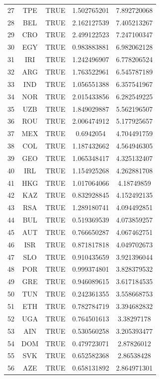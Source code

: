 \documentclass[12pt]{article}
\begin{document}
\begin{longtable}{|c|c|c|c|c|}
27 & TPE & TRUE & 1.502765201 & 7.892720068 \\
28 & BEL & TRUE & 2.162127539 & 7.405213267 \\
29 & CRO & TRUE & 2.499122523 & 7.247100347 \\
30 & EGY & TRUE & 0.983883881 & 6.982062128 \\
31 & IRI & TRUE & 1.242496907 & 6.778206524 \\
32 & ARG & TRUE & 1.763522961 & 6.545787189 \\
33 & IND & TRUE & 1.056551388 & 6.357541967 \\
34 & NOR & TRUE & 2.015433856 & 6.282549225 \\
35 & UZB & TRUE & 1.849029887 & 5.562196507 \\
36 & ROU & TRUE & 2.006474912 & 5.177925657 \\
37 & MEX & TRUE & 0.6942054 & 4.704491759 \\
38 & COL & TRUE & 1.187432662 & 4.564946305 \\
39 & GEO & TRUE & 1.065348417 & 4.325132407 \\
40 & IRL & TRUE & 1.154925268 & 4.262881708 \\
41 & HKG & TRUE & 1.017064066 & 4.18749859 \\
42 & KAZ & TRUE & 0.832928845 & 4.152492135 \\
43 & RSA & TRUE & 1.289180741 & 4.094492851 \\
44 & BUL & TRUE & 0.519369539 & 4.073859257 \\
45 & AUT & TRUE & 0.766650287 & 4.067462751 \\
46 & ISR & TRUE & 0.871817818 & 4.049702673 \\
47 & SLO & TRUE & 0.910435659 & 3.921396044 \\
48 & POR & TRUE & 0.999374801 & 3.828379532 \\
49 & GRE & TRUE & 0.946089615 & 3.617184535 \\
50 & TUN & TRUE & 0.242361355 & 3.558668753 \\
51 & ETH & TRUE & 0.782784719 & 3.394682832 \\
52 & UGA & TRUE & 0.764501613 & 3.38297178 \\
53 & AIN & TRUE & 0.530560258 & 3.205393477 \\
54 & DOM & TRUE & 0.479723071 & 2.87826012 \\
55 & SVK & TRUE & 0.652582368 & 2.86538428 \\
56 & AZE & TRUE & 0.658131892 & 2.864971301 \\

\end{longtable}
\end{document}
